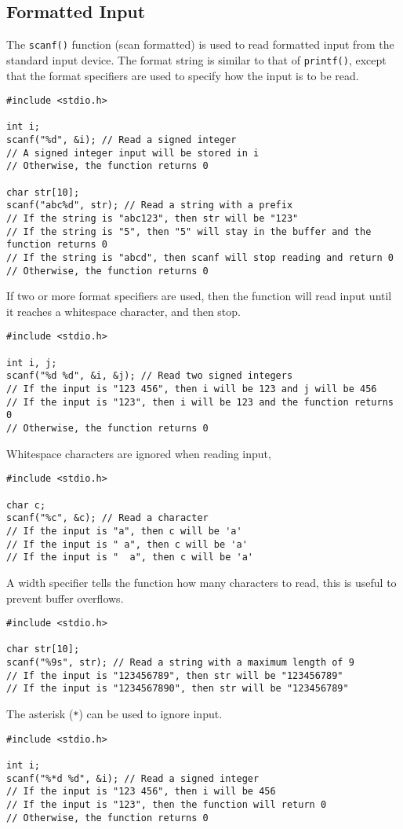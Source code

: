 \documentclass[a4paper]{report}
\begin{document}
\subsection{Formatted Input}
The \texttt{scanf()} function (scan formatted) is used to read
formatted input from the standard input device. The format string is
similar to that of \texttt{printf()}, except that the format
specifiers are used to specify how the input is to be read.
\begin{verbatim}
#include <stdio.h>

int i;
scanf("%d", &i); // Read a signed integer
// A signed integer input will be stored in i
// Otherwise, the function returns 0

char str[10];
scanf("abc%d", str); // Read a string with a prefix
// If the string is "abc123", then str will be "123"
// If the string is "5", then "5" will stay in the buffer and the function returns 0
// If the string is "abcd", then scanf will stop reading and return 0
// Otherwise, the function returns 0
\end{verbatim}
If two or more format specifiers are used, then the function will read
input until it reaches a whitespace character, and then stop.
\begin{verbatim}
#include <stdio.h>

int i, j;
scanf("%d %d", &i, &j); // Read two signed integers
// If the input is "123 456", then i will be 123 and j will be 456
// If the input is "123", then i will be 123 and the function returns 0
// Otherwise, the function returns 0
\end{verbatim}
Whitespace characters are ignored when reading input,
\begin{verbatim}
#include <stdio.h>

char c;
scanf("%c", &c); // Read a character
// If the input is "a", then c will be 'a'
// If the input is " a", then c will be 'a'
// If the input is "  a", then c will be 'a'
\end{verbatim}
A width specifier tells the function how many characters to read, this
is useful to prevent buffer overflows.
\begin{verbatim}
#include <stdio.h>

char str[10];
scanf("%9s", str); // Read a string with a maximum length of 9
// If the input is "123456789", then str will be "123456789"
// If the input is "1234567890", then str will be "123456789"
\end{verbatim}
The asterisk (\texttt{*}) can be used to ignore input.
\begin{verbatim}
#include <stdio.h>

int i;
scanf("%*d %d", &i); // Read a signed integer
// If the input is "123 456", then i will be 456
// If the input is "123", then the function will return 0
// Otherwise, the function returns 0
\end{verbatim}
\end{document}
